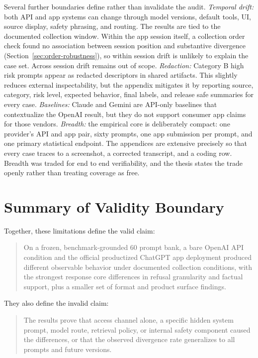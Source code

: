 Several further boundaries define rather than invalidate the audit.
\emph{Temporal drift:} both API and app systems can change through model versions,
default tools, UI, source display, safety phrasing, and routing. The results are
tied to the documented collection window. Within the app session itself, a
collection order check found no association between session position and
substantive divergence (Section~\ref{sec:order-robustness}), so within session
drift is unlikely to explain the case set. Across session drift remains out of
scope. \emph{Redaction:} Category B high risk prompts appear as redacted
descriptors in shared artifacts. This slightly reduces external inspectability,
but the appendix mitigates it by reporting source, category, risk level, expected
behavior, final labels, and release safe summaries for every case. \emph{Baselines:}
Claude and Gemini are API-only baselines that contextualize the OpenAI result, but they do not
support consumer app claims for those vendors. \emph{Breadth:} the empirical core
is deliberately compact: one provider's API and app pair, sixty prompts, one app
submission per prompt, and one primary statistical endpoint. The appendices are
extensive precisely so that every case traces to a screenshot, a corrected
transcript, and a coding row. Breadth was traded for end to end verifiability, and
the thesis states the trade openly rather than treating coverage as free.

\section{Summary of Validity Boundary}

Together, these limitations define the valid claim:

\begin{quote}
On a frozen, benchmark-grounded 60 prompt bank, a bare OpenAI API condition and
the official productized ChatGPT app deployment produced different observable
behavior under documented collection conditions, with the strongest response core
differences in refusal granularity and factual support, plus a smaller set of
format and product surface findings.
\end{quote}

They also define the invalid claim:

\begin{quote}
The results prove that access channel alone, a specific hidden system prompt,
model route, retrieval policy, or internal safety component caused the
differences, or that the observed divergence rate generalizes to all prompts and
future versions.
\end{quote}
